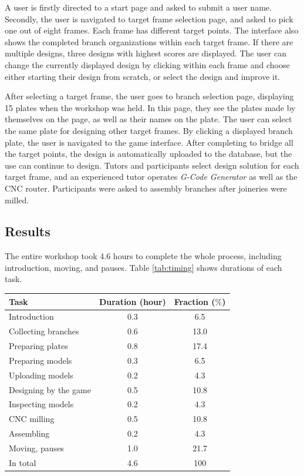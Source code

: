 A user is firstly directed to a start page and asked to submit a user name.
Secondly, the user is navigated to target frame selection page, and asked to pick one out of eight frames.
Each frame has different target points.
The interface also shows the completed branch organizations within each target frame.
If there are multiple designs, three designs with highest scores are displayed.
The user can change the currently displayed design by clicking within each frame and choose either starting their design from scratch, or select the design and improve it.

After selecting a target frame, the user goes to branch selection page, displaying 15 plates when the workshop was held.
In this page, they see the plates made by themselves on the page, as well as their names on the plate.
The user can select the same plate for designing other target frames.
By clicking a displayed branch plate, the user is navigated to the game interface.
After completing to bridge all the target points, the design is automatically uploaded to the database, but the use can continue to design.
Tutors and participants select design solution for each target frame, and an experienced tutor operates \textit{G-Code Generator} as well as the CNC router.
Participants were asked to assembly branches after joineries were milled.

\subsection{Results}
The entire workshop took 4.6 hours to complete the whole process, including introduction, moving, and pauses.
Table \ref{tab:timing} shows durations of each task.

\begin{center}
  \begin{tabulary}{\columnwidth}{ |l||C|C| }
    \hline
    Task & Duration (hour) & Fraction ($\%$) \\
    \hline
    Introduction                  & 0.3 & 6.5  \\
    Collecting branches           & 0.6 & 13.0  \\
    Preparing plates              & 0.8 & 17.4  \\
    Preparing models              & 0.3 & 6.5  \\
    Uploading models              & 0.2 & 4.3 \\
    Designing by the game         & 0.5 & 10.8 \\
    Inspecting models             & 0.2 & 4.3 \\
    CNC milling                   & 0.5 & 10.8\\
    Assembling                    & 0.2 & 4.3 \\
    Moving, pauses               & 1.0 & 21.7 \\
    \hline
    In total                      & 4.6   & 100 \\
    \hline
  \end{tabulary}
  \label{tab:timing}
\end{center}

